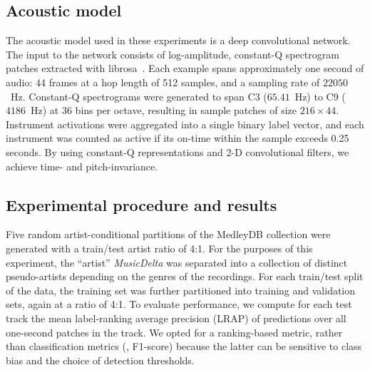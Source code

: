 \documentclass{article}
\begin{document}
\subsection{Acoustic model}

%
%

The acoustic model used in these experiments is a deep convolutional network.
The input to the network consists of log-amplitude, constant-Q spectrogram patches
extracted with librosa~\cite{librosa}.
Each example spans approximately one second of audio: 44 frames at a hop length of 512 
samples, and a sampling rate of $22050$~Hz. 
Constant-Q spectrograms were generated to span C3 ($65.41$~Hz) to C9 ($4186$~Hz) at 36
bins per octave, resulting in sample patches of size $216\times44$.  Instrument activations were aggregated into a single binary label
vector, and each instrument was counted as active if its on-time within the sample
exceeds 0.25 seconds.
By using constant-Q representations and 2-D convolutional filters, we achieve time- and
pitch-invariance.


\subsection{Experimental procedure and results}

Five random artist-conditional partitions of the MedleyDB collection were generated with
a train/test artist ratio of 4:1.  For the purposes of this experiment, 
the ``artist'' \emph{MusicDelta} was separated into a collection of distinct pseudo-artists 
depending on the genres of the recordings.
For each train/test split of the data, the training set was further partitioned into
training and validation sets, again at a ratio of 4:1.
To evaluate performance, we compute for each test track the mean label-ranking average
precision (LRAP) of predictions over all one-second patches in the track.  We opted for
a ranking-based metric, rather than classification metrics (\eg, F1-score) because the
latter can be sensitive to class bias and the choice of detection thresholds.
\end{document}
